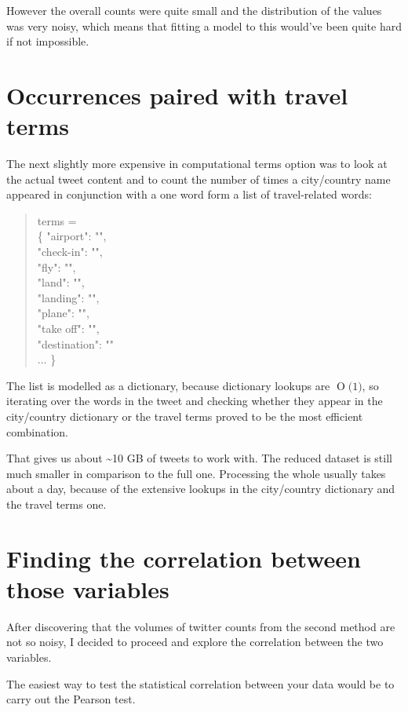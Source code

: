 \documentclass[minf,frontabs,twoside,singlespacing,parskip]{infthesis}
\newcommand{\BigO}[1]{\ensuremath{\operatorname{O}\bigl(#1\bigr)}}
\begin{document}
However the overall counts were quite small and the distribution of the values was very noisy, which means that fitting a model to this would've been quite hard if not impossible.

\section{Occurrences paired with travel terms} 
\label{sec:tweettext}

The next slightly more expensive in computational terms option was to look at the actual tweet content and to count the number of times a city/country name appeared in conjunction with a one word form a list of travel-related words:

\begin{quotation}
terms = \\
\{ "airport": "", \\
"check-in": "", \\
"fly": "", \\
"land": "", \\ 
"landing": "", \\
"plane": "", \\ 
"take off": "", \\
"destination": "" \\
... \}
\end{quotation}

The list is modelled as a dictionary, because dictionary lookups are \BigO{1}, so iterating over the words in the tweet and checking whether they appear in the city/country dictionary or the travel terms proved to be the most efficient combination.

That gives us about  \textasciitilde  10 GB of tweets to work with. The reduced dataset is still much smaller in comparison to the full one. Processing the whole usually takes about a day, because of the extensive lookups in the city/country dictionary and the travel terms one.

\section{Finding the correlation between those variables}

After discovering that the volumes of twitter counts from the second method are not so noisy, I decided to proceed and explore the correlation between the two variables.

The easiest way to test the statistical correlation between your data would be to carry out the Pearson test.
\end{document}

